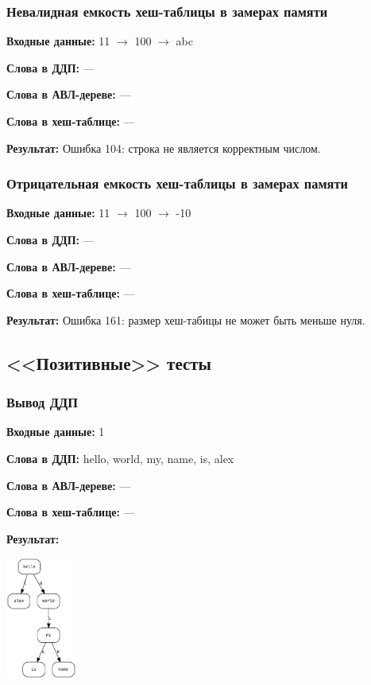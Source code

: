 \documentclass[a4paper,12pt]{extarticle}
\begin{document}
\subsubsection{Невалидная емкость хеш-таблицы в замерах памяти}

\textbf{Входные данные: }
11 $\rightarrow$ 100 $\rightarrow$ abc

\textbf{Слова в ДДП: }
---

\textbf{Слова в АВЛ-дереве: }
---

\textbf{Слова в хеш-таблице: }
---

\textbf{Результат: }
Ошибка 104: строка не является корректным числом.


\subsubsection{Отрицательная емкость хеш-таблицы в замерах памяти}

\textbf{Входные данные: }
11 $\rightarrow$ 100 $\rightarrow$ -10

\textbf{Слова в ДДП: }
---

\textbf{Слова в АВЛ-дереве: }
---

\textbf{Слова в хеш-таблице: }
---

\textbf{Результат: }
Ошибка 161: размер хеш-табицы не может быть меньше нуля.



\subsection{<<Позитивные>> тесты}
\subsubsection{Вывод ДДП}

\textbf{Входные данные: }
1

\textbf{Слова в ДДП: }
hello, world, my, name, is, alex

\textbf{Слова в АВЛ-дереве: }
---

\textbf{Слова в хеш-таблице: }
---

\textbf{Результат: }

\hspace{3cm}
\includegraphics[height=4cm]{1639782059_16807.graph.gv}
\end{document}
